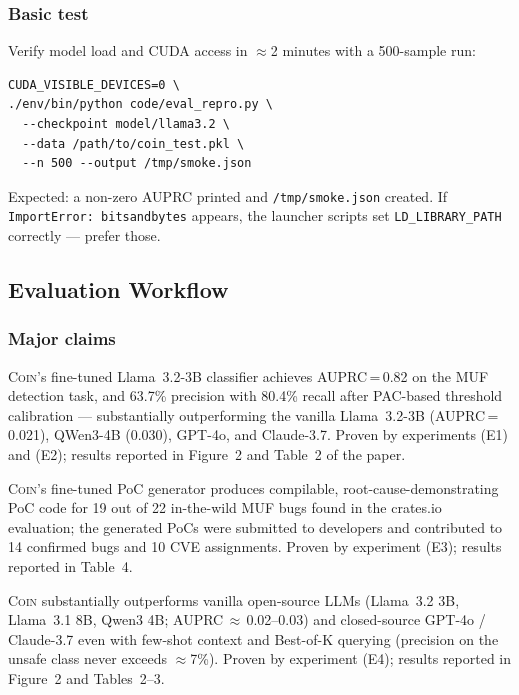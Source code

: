 \documentclass[nonacm,sigconf]{acmart}
\begin{document}
\subsubsection{Basic test}

Verify model load and CUDA access in $\approx$2 minutes with a
500-sample run:
\begin{verbatim}
CUDA_VISIBLE_DEVICES=0 \
./env/bin/python code/eval_repro.py \
  --checkpoint model/llama3.2 \
  --data /path/to/coin_test.pkl \
  --n 500 --output /tmp/smoke.json
\end{verbatim}
Expected: a non-zero AUPRC printed and \texttt{/tmp/smoke.json} created.
If \texttt{ImportError: bitsandbytes} appears, the launcher scripts set
\texttt{LD\_LIBRARY\_PATH} correctly --- prefer those.


\subsection{Evaluation Workflow}

\subsubsection{Major claims}

\begin{compactitem}
\item[(C1):]
  \textsc{Coin}'s fine-tuned Llama~3.2-3B classifier achieves
  AUPRC\,=\,0.82 on the MUF detection task, and 63.7\% precision
  with 80.4\% recall after PAC-based threshold calibration ---
  substantially outperforming the vanilla Llama~3.2-3B (AUPRC\,=\,0.021),
  QWen3-4B (0.030), GPT-4o, and Claude-3.7.
  Proven by experiments (E1) and (E2); results reported in
  Figure~2 and Table~2 of the paper.

\item[(C2):]
  \textsc{Coin}'s fine-tuned PoC generator produces compilable,
  root-cause-demonstrating PoC code for 19 out of 22 in-the-wild
  MUF bugs found in the crates.io evaluation; the generated PoCs
  were submitted to developers and contributed to 14 confirmed bugs
  and 10 CVE assignments.
  Proven by experiment (E3); results reported in Table~4.

\item[(C3):]
  \textsc{Coin} substantially outperforms vanilla open-source LLMs
  (Llama~3.2 3B, Llama~3.1 8B, Qwen3 4B; AUPRC\,$\approx$\,0.02--0.03)
  and closed-source GPT-4o / Claude-3.7 even with few-shot context
  and Best-of-K querying (precision on the unsafe class never exceeds
  $\approx$7\%).
  Proven by experiment (E4); results reported in Figure~2 and Tables~2--3.
\end{compactitem}
\end{document}
